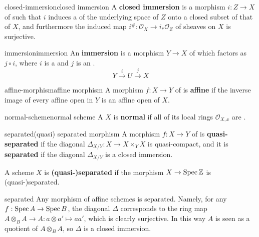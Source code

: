 \begin{topic}{closed-immersion}{closed immersion}
    A \textbf{closed immersion} is a morphism $i : Z \to X$ of  such that $i$ induces a  of the underlying space of $Z$ onto a closed subset of that of $X$, and furthermore the induced map $i^\# : \mathcal{O}_X \to i_*\mathcal{O}_Z$ of sheaves on $X$ is surjective.
\end{topic}

\begin{topic}{immersion}{immersion}
    An \textbf{immersion} is a morphism $Y \to X$ of  which factors as $j \circ i$, where $i$ is a  and $j$ is an .
    \[ Y \xrightarrow{i} U \xrightarrow{j} X \]
\end{topic}

\begin{topic}{affine-morphism}{affine morphism}
    A morphism $f : X \to Y$ of  is \textbf{affine} if the inverse image of every affine open in $Y$ is an affine open of $X$. 
\end{topic}

\begin{topic}{normal-scheme}{normal scheme}
    A  $X$ is \textbf{normal} if all of its local rings $\mathcal{O}_{X,x}$ are  .
\end{topic}

\begin{topic}{separated}{(quasi) separated morphism}
    A morphism $f : X \to Y$ of  is \textbf{quasi-separated} if the diagonal $\Delta_{X/Y} : X \to X \times_Y X$ is quasi-compact, and it is \textbf{separated} if the diagonal $\Delta_{X/Y}$ is a closed immersion.
    
    A scheme $X$ is \textbf{(quasi-)separated} if the morphism $X \to \operatorname{Spec} \mathbb{Z}$ is (quasi-)separated.
\end{topic}

\begin{example}{separated}
    Any morphism of affine schemes is separated. Namely, for any $f : \operatorname{Spec} A \to \operatorname{Spec} B$, the diagonal $\Delta$ corresponds to the ring map $A \otimes_B A \to A : a \otimes a' \mapsto aa'$, which is clearly surjective. In this way $A$ is seen as a quotient of $A \otimes_B A$, so $\Delta$ is a closed immersion.
\end{example}

